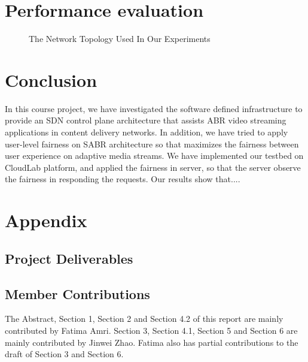 \documentclass[12pt]{article}
\begin{document}
\newpage
\section{Performance evaluation}

\begin{figure}[H]
\centering

\caption{The Network Topology Used In Our Experiments}
\label{fig:ourarch}
\end{figure}







\newpage
\section{Conclusion}
In this course project, we have investigated the software defined infrastructure to provide an SDN control plane architecture that assists ABR video streaming applications in content delivery networks. In addition, we have tried to apply user-level fairness on SABR architecture so that maximizes the fairness between user experience on adaptive media streams. We have implemented our testbed on CloudLab platform, and applied the fairness in server, so that the server observe the fairness in responding the requests. Our results show that....



\printbibliography[heading=bibnumbered]

\newpage

\section{Appendix}

\subsection{Project Deliverables}






\subsection{Member Contributions}
The Abstract, Section 1, Section 2 and Section 4.2 of this report are mainly contributed by Fatima Amri. Section 3, Section 4.1, Section 5 and Section 6 are mainly contributed by Jinwei Zhao. Fatima also has partial contributions to the draft of Section 3 and Section 6. 
\end{document}
